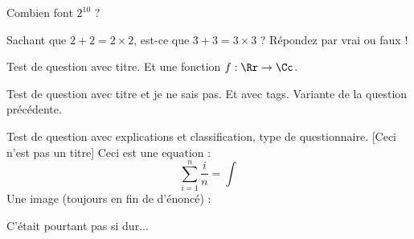 

\begin{question}

Combien font \(2^{10}\) ?

\begin{answers}
\end{answers}
\end{question}


\begin{question}

Sachant que \(2+2=2\times 2\), 
est-ce que \(3+3 = 3\times 3\) ?
Répondez par vrai ou faux !

\begin{answers}
\end{answers}
\end{question}


\begin{question}

Test de question avec titre. Et une fonction \(f : \Rr \to \Cc\).

\begin{answers}
\end{answers}
\end{question}


\begin{question}
\qkeeporder
\qidontknow

Test de question avec titre et je ne sais pas. Et avec tags. Variante de la question précédente.

\begin{answers}
\end{answers}
\end{question}


\begin{question}
\qoneline

Test de question avec explications et classification, type de questionnaire. [Ceci n'est pas un titre]
Ceci est une equation :
\[\sum_{i=1}^n \frac{i}{n}=\int\]
Une image (toujours en fin de d'énoncé) : 


\begin{answers}
\end{answers}
\begin{explanations}
C'était pourtant pas si dur...
\end{explanations}
\end{question}
